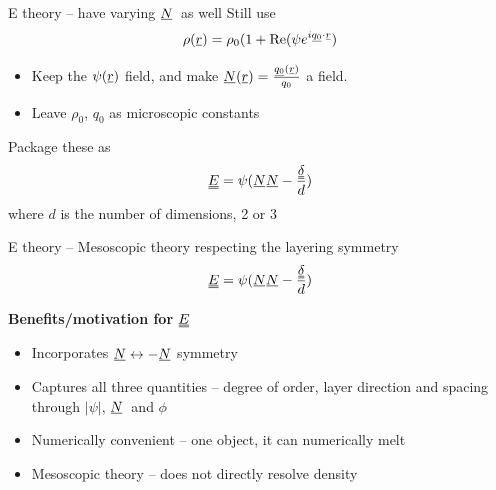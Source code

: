 \documentclass[10pt,mathserif]{beamer}
\newcommand{\suf}[2]{\stackunder[0.5pt]{\stackunder[1pt]{\ensuremath{#1}}{\rule{\widthof{\ensuremath{#2}}*\real{0.9}}{.1ex}}}{}}
\newcommand{\duf}[2]{\stackunder[0.5pt]{\stackunder[0.8pt]{\stackunder[1pt]{\ensuremath{#1}}{\rule{\widthof{\ensuremath{#2}}*\real{0.9}}{.1ex}}}{\rule{\widthof{\ensuremath{#2}}*\real{0.9}}{.1ex}}}{}}
\newcommand{\su}[1]{\suf{#1}{#1}}
\newcommand{\du}[1]{\duf{#1}{#1}}
\newcommand{\ssu}[1]{\scriptsize\su{#1}\normalsize}
\newcommand{\NN}{\ensuremath{\su{N}}}
\newcommand{\EE}{\ensuremath{\du{E}}}
\newcommand{\extra}[1]{\color{gray} #1 \normalcolor}
\newcommand{\subheading}[1]{\large\textbf{#1}\normalsize}
\begin{document}
\begin{frame}[fragile]{E theory -- have varying \NN\ as well}
    \newrefsection
    Still use
    \begin{equation*}
        \rho(\su{r}) = \rho_0 (1 + \Re(\psi e^{i\ssu{q_0} \cdot \ssu{r}})
    \end{equation*}
    \vspace{-1.5em}
    \begin{itemize}
        \item Keep the $\psi(\su{r})$ field, and make $\NN(\su{r}) = \frac{\ssu{q_0}(\ssu{r})}{q_0}$ a field.
        \item Leave $\rho_0$, $q_0$ as microscopic constants
    \end{itemize}
    \vfill
    Package these as
    \begin{equation*}
        \du{E} = \psi(\su{N}\su{N} - \frac{\du{\delta}}{d})
    \end{equation*}
    \extra{where $d$ is the number of dimensions, 2 or 3}
\end{frame}

\begin{frame}[fragile]{E theory -- Mesoscopic theory respecting the layering symmetry}
    \newrefsection
    \vspace{-\fill}
    \begin{equation*}
        \du{E} = \psi(\su{N}\su{N} - \frac{\du{\delta}}{d})
    \end{equation*}
    \vfill

    \subheading{Benefits/motivation for \EE}
    \begin{itemize}
        \item Incorporates $\NN\leftrightarrow-\NN$ symmetry
        \item Captures all three quantities -- degree of order, layer direction and spacing through $|\psi|$, \NN\ and $\phi$
        \item Numerically convenient -- one object, it can numerically melt
        \extra{\item Mesoscopic theory -- does not directly resolve density}
    \end{itemize}
\end{frame}
\end{document}
